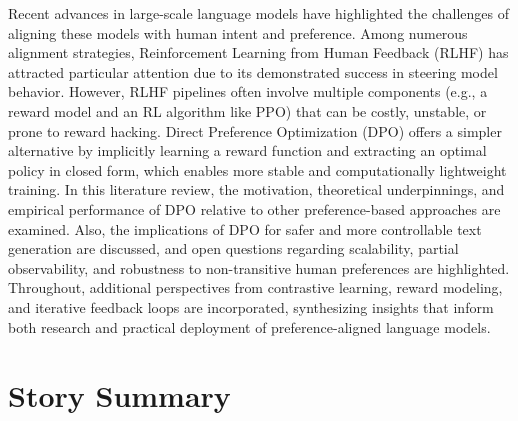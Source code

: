 \documentclass[a4paper,oneside,10pt,ngerman,english]{scrartcl}
\begin{document}



\cleardoubleoddpage


Recent advances in large-scale language models have highlighted the challenges of aligning these models with human intent and preference. Among numerous alignment strategies, Reinforcement Learning from Human Feedback (RLHF) has attracted particular attention due to its demonstrated success in steering model behavior. However, RLHF pipelines often involve multiple components (e.g., a reward model and an RL algorithm like PPO) that can be costly, unstable, or prone to reward hacking. Direct Preference Optimization (DPO) offers a simpler alternative by implicitly learning a reward function and extracting an optimal policy in closed form, which enables more stable and computationally lightweight training. In this literature review, the motivation, theoretical underpinnings, and empirical performance of DPO relative to other preference-based approaches are examined. Also, the implications of DPO for safer and more controllable text generation are discussed, and open questions regarding scalability, partial observability, and robustness to non-transitive human preferences are highlighted. Throughout, additional perspectives from contrastive learning, reward modeling, and iterative feedback loops are incorporated, synthesizing insights that inform both research and practical deployment of preference-aligned language models.



\section{Story Summary}
\label{sec:storysummary}
\end{document}
